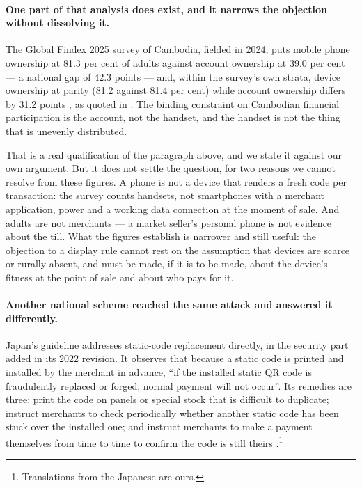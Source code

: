 \documentclass[10pt,a4paper,twocolumn]{article}
\begin{document}
\paragraph{One part of that analysis does exist, and it narrows the objection
without dissolving it.} The Global Findex 2025 survey of Cambodia, fielded in
2024, puts mobile phone ownership at 81.3 per cent of adults against account
ownership at 39.0 per cent --- a national gap of 42.3 points --- and, within the
survey's own strata, device ownership at parity (81.2 against 81.4 per cent)
while account ownership differs by 31.2 points \citep{findex2025}, as quoted in
\citet{chay2026stages}. The
binding constraint on Cambodian financial participation is the account, not the
handset, and the handset is not the thing that is unevenly distributed.

That is a real qualification of the paragraph above, and we state it against our
own argument. But it does not settle the question, for two reasons we cannot
resolve from these figures. A phone is not a device that renders a fresh code
per transaction: the survey counts handsets, not smartphones with a merchant
application, power and a working data connection at the moment of sale. And
adults are not merchants --- a market seller's personal phone is not evidence
about the till. What the figures establish is narrower and still useful: the
objection to a display rule cannot rest on the assumption that devices are
scarce or rurally absent, and must be made, if it is to be made, about the
device's fitness at the point of sale and about who pays for it.

\paragraph{Another national scheme reached the same attack and answered it
differently.} Japan's guideline addresses static-code replacement directly, in
the security part added in its 2022 revision. It observes that because a static
code is printed and installed by the merchant in advance, ``if the installed
static QR code is fraudulently replaced or forged, normal payment will not
occur''. Its remedies are three: print the code on panels or special stock that
is difficult to duplicate; instruct merchants to check periodically whether
another static code has been stuck over the installed one; and instruct
merchants to make a payment themselves from time to time to confirm the code is
still theirs \citep{jpqrmpm}.\footnote{Translations from the Japanese are ours.}
\end{document}
